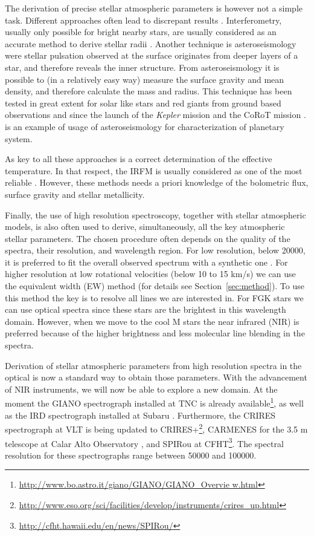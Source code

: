 \documentclass{aa}
\begin{document}
The derivation of precise stellar atmospheric parameters is however not
a simple task. Different approaches often lead to discrepant results
\citep[see e.g.][]{Santos13}. Interferometry, usually only possible for
bright nearby stars, are usually considered as an accurate method to
derive stellar radii \citep[e.g.][]{Boyajian2012}. Another technique
is asteroseismology were stellar pulsation observed at the surface
originates from deeper layers of a star, and therefore reveals the inner
structure. From asteroseismology it is possible to (in a relatively
easy way) measure the surface gravity and mean density, and therefore
\citep{Kjeldsen1995} calculate the mass and radius. This technique has
been tested in great extent for solar like stars and red giants from
ground based observations and since the launch of the \emph{Kepler}
mission and the CoRoT mission \citep{Michel2008,Huber2011,Huber2012}.
\cite{Campante2015} is an example of usage of asteroseismology for
characterization of planetary system.

As key to all these approaches is a correct determination
of the effective temperature. In that respect, the
IRFM is usually considered as one of the most reliable
\citep{Blackwell1977,Ramirez2005b,Casagrande2010}. However, these
methods needs a priori knowledge of the bolometric flux, surface gravity
and stellar metallicity.

Finally, the use of high resolution spectroscopy, together with stellar
atmospheric models, is also often used to derive, simultaneously,
all the key atmospheric stellar parameters. The chosen procedure
often depends on the quality of the spectra, their resolution, and
wavelength region. For low resolution, below 20000, it is preferred
to fit the overall observed spectrum with a synthetic one \citep[see
e.g.][]{Recio2006}. For higher resolution at low rotational velocities
(below 10 to 15 \si{km/s}) we can use the equivalent width (EW) method
(for details see Section~\ref{sec:method}). To use this method the key
is to resolve all lines we are interested in. For FGK stars we can use
optical spectra since these stars are the brightest in this wavelength
domain. However, when we move to the cool M stars the near infrared
(NIR) is preferred because of the higher brightness and less molecular
line blending in the spectra.

Derivation of stellar atmospheric parameters from high
resolution spectra in the optical is now a standard way
to obtain those parameters. With the advancement of NIR
instruments, we will now be able to explore a new domain. At
the moment the GIANO spectrograph installed at TNC is already
available\footnote{\url{http://www.bo.astro.it/giano/GIANO/GIANO_Overvie
w.html}}, as well as the IRD spectrograph installed at Subaru
\citep{IRD}. Furthermore, the CRIRES spectrograph at VLT is being
updated to
CRIRES+\footnote{\url{http://www.eso.org/sci/facilities/develop/instruments/crires_up.html}},
CARMENES for the 3.5 m telescope at Calar Alto Observatory \citep{CARMENES}, and
SPIRou at CFHT\footnote{\url{http://cfht.hawaii.edu/en/news/SPIRou/}}. The spectral
resolution for these spectrographs range between 50000 and 100000.
\end{document}
